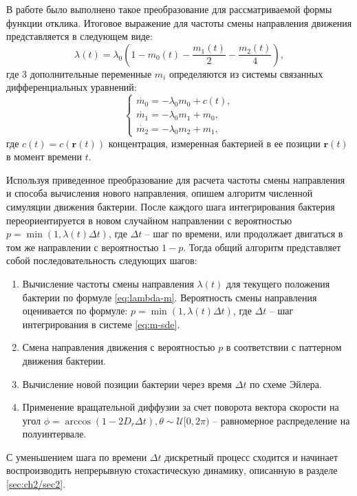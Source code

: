 В работе \cite{celani_bacterial_2010} было выполнено такое преобразование для рассматриваемой формы функции отклика. Итоговое выражение для частоты смены направления движения представляется в следующем виде:
\begin{equation}
	\lambda(t) = \lambda_0 \left (1 - m_0(t) - \frac{m_1(t)}{2} - \frac{m_2(t)}{4} \right ),
	\label{eq:lambda-m}
\end{equation}
где 3 дополнительные переменные $m_i$ определяются из системы связанных дифференциальных уравнений:
\begin{equation}
	\begin{cases}
		\dot{m_0} = -\lambda_0 m_0 + c(t), \\
		\dot{m_1} = -\lambda_0 m_1 + m_0, \\
		\dot{m_2} = -\lambda_0 m_2 + m_1,
	\end{cases}
    \label{eq:m-sde}
\end{equation}
где $c(t) = c(\textbf{r}(t))$ концентрация, измеренная бактерией в ее позиции $\textbf{r}(t)$ в момент времени $t$. 

Используя приведенное преобразование для расчета частоты смены направления и способа вычисления нового направления, опишем алгоритм численной симуляции движения бактерии.  После каждого шага интегрирования бактерия переориентируется в новом случайном направлении с вероятностью $p = \min (1, \lambda(t) \Delta t)$, где $\Delta t$ -- шаг по времени, или продолжает двигаться в том же направлении с вероятностью $1-p$. Тогда общий алгоритм представляет собой последовательность следующих шагов:
\begin{enumerate}
	\item Вычисление частоты смены направления $\lambda(t)$ для текущего положения бактерии по формуле \cref{eq:lambda-m}. Вероятность смены направления оценивается по формуле: $p = \min (1, \lambda(t) \Delta t)$, где $\Delta t$ -- шаг интегрирования в системе \cref{eq:m-sde}. 
    \item Смена направления движения с вероятностью $p$ в соответствии с паттерном движения бактерии.
	\item Вычисление новой позиции бактерии через время $\Delta t$ по схеме Эйлера.
	\item Применение вращательной диффузии за счет поворота вектора скорости на угол $\phi =\arccos{(1 - 2 D_r \Delta t)}, \theta \sim \mathcal{U}[0, 2\pi)$ -- равномерное распределение на полуинтервале.
\end{enumerate}

С уменьшением шага по времени $\Delta t$ дискретный процесс сходится и начинает воспроизводить непрерывную стохастическую динамику, описанную в разделе \cref{sec:ch2/sec2}.


